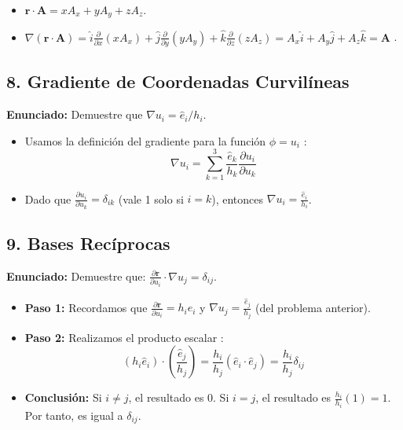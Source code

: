 \documentclass[a4paper]{article}
\begin{document}
\begin{itemize}
    \item $\mathbf{r} \cdot \mathbf{A} = xA_x + yA_y + zA_z$.
    \item $\nabla(\mathbf{r} \cdot \mathbf{A}) = \hat{i} \frac{\partial}{\partial x}(xA_x) + \hat{j} \frac{\partial}{\partial y}(yA_y) + \hat{k} \frac{\partial}{\partial z}(zA_z) = A_x\hat{i} + A_y\hat{j} + A_z\hat{k} = \mathbf{A}$ \cite{83}.
\end{itemize}

\subsection*{8. Gradiente de Coordenadas Curvilíneas}
\textbf{Enunciado:} Demuestre que $\nabla u_i = \hat{e}_i/h_i$.

\begin{itemize}
    \item Usamos la definición del gradiente para la función $\phi = u_i$ \cite{79, 83}:
    \begin{equation}
        \nabla u_i = \sum_{k=1}^3 \frac{\hat{e}_k}{h_k} \frac{\partial u_i}{\partial u_k}
    \end{equation}
    \item Dado que $\frac{\partial u_i}{\partial u_k} = \delta_{ik}$ (vale 1 solo si $i=k$), entonces $\nabla u_i = \frac{\hat{e}_i}{h_i}$.
\end{itemize}

\subsection*{9. Bases Recíprocas}
\textbf{Enunciado:} Demuestre que: $\frac{\partial \mathbf{r}}{\partial u_i} \cdot \nabla u_j = \delta_{ij}$.

\begin{itemize}
    \item \textbf{Paso 1:} Recordamos que $\frac{\partial \mathbf{r}}{\partial u_i} = h_i \hat{e}_i$ \cite{41} y $\nabla u_j = \frac{\hat{e}_j}{h_j}$ (del problema anterior).
    \item \textbf{Paso 2:} Realizamos el producto escalar \cite{83}:
    \begin{equation}
        (h_i \hat{e}_i) \cdot \left( \frac{\hat{e}_j}{h_j} \right) = \frac{h_i}{h_j} (\hat{e}_i \cdot \hat{e}_j) = \frac{h_i}{h_j} \delta_{ij}
    \end{equation}
    \item \textbf{Conclusión:} Si $i \neq j$, el resultado es 0. Si $i = j$, el resultado es $\frac{h_i}{h_i} (1) = 1$. Por tanto, es igual a $\delta_{ij}$.
\end{itemize}
\end{document}
